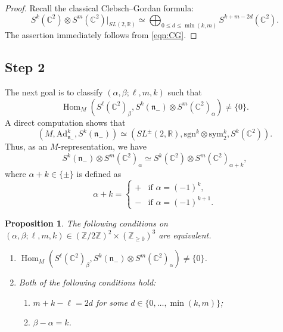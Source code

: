 \documentclass[reqno,11pt]{amsart}
\newtheorem{prop}[equation]{Proposition}
\theoremstyle{remark}
\numberwithin{equation}{section}
\newcommand{\ga}{\alpha}
\newcommand{\fn}{{\mathfrak n}}
\newcommand{\R}{\mathbb{R}}
\newcommand{\C}{\mathbb{C}}
\newcommand{\Z}{\mathbb{Z}}
\newcommand{\Ad}{\mathrm{Ad}}
\newcommand{\Hom}{\operatorname{Hom}}
\newcommand{\sym}{\mathrm{sym}}
\newcommand{\sgn}{\mathrm{sgn}}
\begin{document}
\begin{proof}
Recall the classical Clebsch–Gordan formula:
\begin{equation}\label{eqn:CG}
S^k(\C^2)\otimes S^m(\C^2)\vert_{SL(2,\R)}
\simeq 
\bigoplus_{0\leq d \leq \min(k,m)}S^{k+m-2d}(\C^2).
\end{equation}
The assertion immediately follows from \eqref{eqn:CG}.
\end{proof}

\subsection{Step 2}
The next goal is to classify 
$(\alpha,\beta;\ell,m,k)$ such that
\begin{equation*}
\Hom_{M}(S^\ell(\C^2)_\beta, S^k(\fn_-)\otimes S^m(\C^2)_\alpha) \neq \{0\}.
\end{equation*}
A direct computation shows that
\begin{equation*}
(M,\Ad^k_{\fn_-},S^k(\fn_-))
\simeq (SL^{\pm}(2,\R), \sgn^{k}\otimes \sym_2^k, S^k(\C^2)).
\end{equation*}
Thus, as an $M$-representation, we have
\begin{equation*}
S^k(\fn_-)\otimes S^m(\C^2)_\ga
\simeq
S^k(\C^2) \otimes S^m(\C^2)_{\ga+k},
\end{equation*}
where $\ga + k \in \{\pm\}$ is defined as 
\begin{equation}\label{eqn:ak}
\ga+k=
\begin{cases}
+ & \text{if $\ga=(-1)^k$},\\
- & \text{if $\ga=(-1)^{k+1}$}.
\end{cases}
\end{equation}

\begin{prop}\label{prop:Step2}
The following conditions on 
$(\alpha,\beta;\ell,m,k)\in (\Z/2\Z)^2 \times (\Z_{\geq 0})^3$
are equivalent.
\begin{enumerate}
\item[\emph{(i)}] 
$\Hom_{M}(S^\ell(\C^2)_\beta, S^k(\fn_-)\otimes S^m(\C^2)_\alpha) \neq \{0\}$.
\item[\emph{(ii)}] Both of the following conditions hold:
\begin{enumerate}
\item[\emph{(ii-a)}] $m+k-\ell=2d$ for some $d \in \{0,\ldots, \min(k,m)\}$;
\item[\emph{(ii-b)}] $\beta -\alpha=  k$.
\end{enumerate}
\end{enumerate}
\end{prop}
\end{document}
